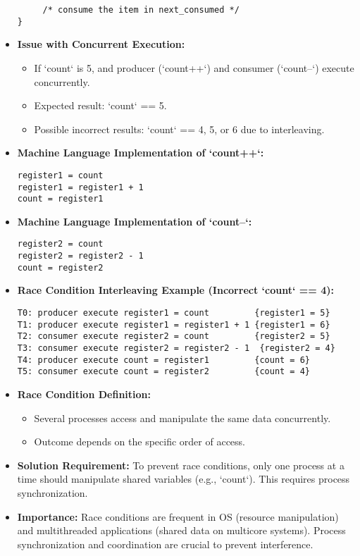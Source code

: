 \begin{itemize}
\begin{verbatim}
     /* consume the item in next_consumed */
}
\end{verbatim}
    \item \textbf{Issue with Concurrent Execution:}
    \begin{itemize}
        \item If `count` is 5, and producer (`count++`) and consumer (`count--`) execute concurrently.
        \item Expected result: `count` == 5.
        \item Possible incorrect results: `count` == 4, 5, or 6 due to interleaving.
    \end{itemize}
    \item \textbf{Machine Language Implementation of `count++`:}
\begin{verbatim}
register1 = count
register1 = register1 + 1
count = register1
\end{verbatim}
    \item \textbf{Machine Language Implementation of `count--`:}
\begin{verbatim}
register2 = count
register2 = register2 - 1
count = register2
\end{verbatim}
    \item \textbf{Race Condition Interleaving Example (Incorrect `count` == 4):}
\begin{verbatim}
T0: producer execute register1 = count         {register1 = 5}
T1: producer execute register1 = register1 + 1 {register1 = 6}
T2: consumer execute register2 = count         {register2 = 5}
T3: consumer execute register2 = register2 - 1  {register2 = 4}
T4: producer execute count = register1         {count = 6}
T5: consumer execute count = register2         {count = 4}
\end{verbatim}
    \item \textbf{Race Condition Definition:}
    \begin{itemize}
        \item Several processes access and manipulate the same data concurrently.
        \item Outcome depends on the specific order of access.
    \end{itemize}
    \item \textbf{Solution Requirement:} To prevent race conditions, only one process at a time should manipulate shared variables (e.g., `count`). This requires process synchronization.
    \item \textbf{Importance:} Race conditions are frequent in OS (resource manipulation) and multithreaded applications (shared data on multicore systems). Process synchronization and coordination are crucial to prevent interference.
\end{itemize}

